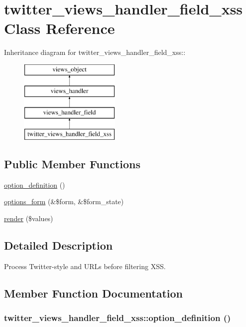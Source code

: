 \hypertarget{classtwitter__views__handler__field__xss}{
\section{twitter\_\-views\_\-handler\_\-field\_\-xss Class Reference}
\label{classtwitter__views__handler__field__xss}
}
Inheritance diagram for twitter\_\-views\_\-handler\_\-field\_\-xss::\begin{figure}[H]
\begin{center}
\leavevmode
\includegraphics[height=4cm]{classtwitter__views__handler__field__xss}
\end{center}
\end{figure}
\subsection*{Public Member Functions}
\begin{CompactItemize}
\item 
\hyperlink{classtwitter__views__handler__field__xss_b4f2a99eda9640650d83f2b485e9a753}{option\_\-definition} ()
\item 
\hyperlink{classtwitter__views__handler__field__xss_4896b110fa64c3beed9fb17b5f01b437}{options\_\-form} (\&\$form, \&\$form\_\-state)
\item 
\hyperlink{classtwitter__views__handler__field__xss_bdab73a5e799f01200e58edcd603a32d}{render} (\$values)
\end{CompactItemize}


\subsection{Detailed Description}
Process Twitter-style  and URLs before filtering XSS. 

\subsection{Member Function Documentation}
\hypertarget{classtwitter__views__handler__field__xss_b4f2a99eda9640650d83f2b485e9a753}{
\subsubsection[{option\_\-definition}]{\setlength{\rightskip}{0pt plus 5cm}twitter\_\-views\_\-handler\_\-field\_\-xss::option\_\-definition ()}}
\label{classtwitter__views__handler__field__xss_b4f2a99eda9640650d83f2b485e9a753}


